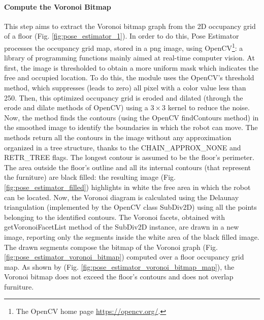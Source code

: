 \paragraph{Compute the Voronoi Bitmap} This step aims to extract the Voronoi bitmap graph from the 2D occupancy grid of a floor (Fig. \ref{fig:pose_estimator_1}). In order to do this, Pose Estimator processes the occupancy grid map, stored in a \textsf{png} image, using OpenCV\footnote{The OpenCV home page \url{https://opencv.org/}.}: a library of programming functions mainly aimed at real-time computer vision. At first, the image is thresholded to obtain a more uniform mask which indicates the free and occupied location. To do this, the module uses the OpenCV's \textsf{threshold} method, which suppresses (leads to zero) all pixel with a color value less than 250. Then, this optimized occupancy grid is eroded and dilated (through the \textsf{erode} and \textsf{dilate} methods of OpenCV) using a $3 \times 3$ kernel to reduce the noise. Now, the method finds the contours (using the OpenCV \textsf{findContours} method) in the smoothed image to identify the boundaries in which the robot can move. The methods return all the contours in the image without any approximation organized in a tree structure, thanks to the \textsf{CHAIN\_APPROX\_NONE} and \textsf{RETR\_TREE} flags. The longest contour is assumed to be the floor's perimeter. The area outside the floor's outline and all its internal contours (that represent the furniture) are black filled: the resulting image (Fig. \ref{fig:pose_estimator_filled}) highlights in white the free area in which the robot can be located. Now, the Voronoi diagram is calculated using the Delaunay triangulation \cite{delaunayproof} (implemented by the OpenCV class \textsf{SubDiv2D}) using all the points belonging to the identified contours.  The Voronoi facets, obtained with \textsf{getVoronoiFacetList} method of the \textsf{SubDiv2D} instance, are drawn in a new image, reporting only the segments inside the white area of the black filled image. The drawn segments compose the bitmap of the Voronoi graph (Fig. \ref{fig:pose_estimator_voronoi_bitmap}) computed over a floor occupancy grid map. As shown by (Fig. \ref{fig:pose_estimator_voronoi_bitmap_map}), the Voronoi bitmap does not exceed the floor's contours and does not overlap furniture. 

